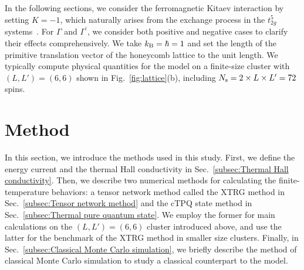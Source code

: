\documentclass[twocolumn,superscriptaddress,showpacs, longbibliography, aps, prx]{revtex4-2}
\begin{document}
In the following sections, we consider the ferromagnetic Kitaev interaction by setting $K= -1$, which naturally arises from the exchange process in the $t_{2g}^5$ systems{~\cite{Jackeli_PRL2009}}. 
For $\Gamma$ and $\Gamma^\prime$, we consider both positive and negative cases to clarify their effects comprehensively. We take $k_{\rm B} = \hbar = 1$ and set the length of the primitive translation vector of the honeycomb lattice to the unit length.
We typically compute physical quantities for the model on a finite-size cluster with $(L, L') = (6, 6)$ shown in Fig.~\ref{fig:lattice}(b), including $N_{\rm s}=2\times L\times L^{\prime} =72$ spins.

\section{Method}
\label{sec:method}
In this section, we introduce the methods used in this study. 
First, we define the energy current and the thermal Hall conductivity in Sec.~\ref{subsec:Thermal Hall conductivity}. 
Then, we describe two numerical methods for calculating the finite-temperature behaviors: a tensor network method called the XTRG method in Sec.~\ref{subsec:Tensor network method} and the cTPQ state method in Sec.~\ref{subsec:Thermal pure quantum state}. 
We employ the former for main calculations on the $(L, L') = (6, 6)$ cluster introduced above, and use the latter for the benchmark of the XTRG method in smaller size clusters.
Finally, in Sec.~\ref{subsec:Classical Monte Carlo simulation}, we briefly describe the method of classical Monte Carlo simulation to study a classical counterpart to the model.
\end{document}
